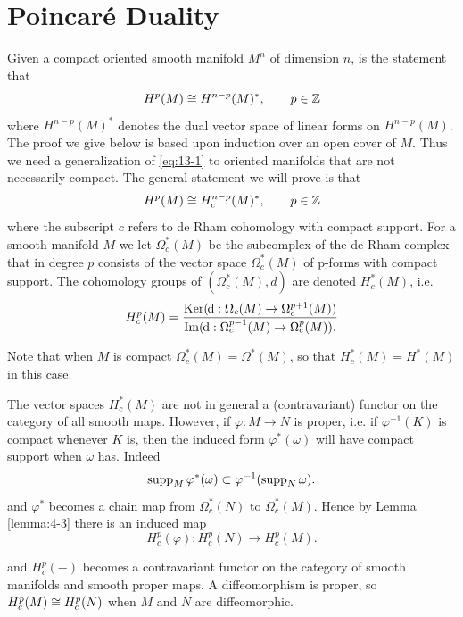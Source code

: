 \chapter{Poincar\'{e} Duality}
Given a compact oriented smooth manifold $M^n$ of dimension $n$, 
is the statement that
\begin{align}\label{eq:13-1}
  H^p(M) \cong H^{n-p}(M)^*,\qquad p\in{\ensuremath{\mathbb{Z}}} 
\end{align}
where $H^{n-p}(M)^*$ denotes the dual vector space of linear forms on $H^{n-p}(M)$.
The proof we give below is based upon induction over an open cover of $M$. Thus
we need a generalization of \eqref{eq:13-1} to oriented manifolds that are not necessarily
compact. The general statement we will prove is that
\begin{align}\label{eq:13-2}
  H^p(M) \cong H^{n-p}_c(M)^*,\qquad p\in{\ensuremath{\mathbb{Z}}}
\end{align}
where the subscript $c$ refers to de Rham cohomology with compact support.
For a smooth manifold $M$ we let $\Omega_c^*(M)$ be the subcomplex of the de Rham
complex that in degree $p$ consists of the vector space $\Omega_c^*(M)$ of p-forms with
compact support. The cohomology groups of $(\Omega_c^*(M), d)$ are denoted $H_c^*(M)$,
i.e.
\[
  H_c^p(M) = \frac
    {
      \ker(\!\dd:\Omega_c(M)\to\Omega_{c}^{p+1}(M))}
    {
      \im(\!\dd:\Omega_c^{p-1}(M)\to\Omega_c^p(M)).
    }
\]

Note that when $M$ is compact $\Omega_c^*(M)=\Omega^*(M)$, so that $H_c^*(M)=H^*(M)$ in this case.

The vector spaces $H_c^*(M)$ are not in general a (contravariant) functor on the
category of all smooth maps. However, if $\varphi:M\to N$ is proper, i.e. if $\varphi^{-1}(K)$ is
compact whenever $K$ is, then the induced form $\varphi^*(\omega)$ will have compact support
when $\omega$ has. Indeed
\[
  \operatorname{supp}_M\varphi^*(\omega) \subset \varphi^{-1}(\operatorname{supp}_N\omega).
\]
and $\varphi^*$ becomes a chain map from $\Omega_c^*(N)$ to $\Omega_c^*(M)$. Hence by Lemma \ref{lemma:4-3} there
is an induced map
\[
  H_c^p(\varphi):H_c^p(N)\to H_c^p(M).
\]

and $H_c^p(-)$ becomes a contravariant functor on the category of smooth manifolds
and smooth proper maps. A diffeomorphism is proper, so $H_c^p(M)\cong H_c^p(N)$
when $M$ and $N$ are diffeomorphic.


